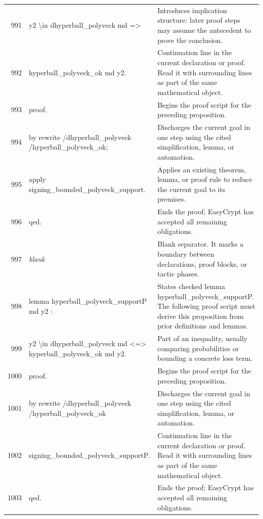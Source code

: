 \documentclass[10pt]{article}
\begin{document}
\begin{longtable}{r L{0.53\textwidth} L{0.37\textwidth}}
991 & {\ttfamily\scriptsize   y2 \textbackslash{}in dhyperball\_polyveck md =>} & Introduces implication structure: later proof steps may assume the antecedent to prove the conclusion. \\
992 & {\ttfamily\scriptsize   hyperball\_polyveck\_ok md y2.} & Continuation line in the current declaration or proof.  Read it with surrounding lines as part of the same mathematical object. \\
993 & {\ttfamily\scriptsize proof.} & Begins the proof script for the preceding proposition. \\
994 & {\ttfamily\scriptsize by rewrite /dhyperball\_polyveck /hyperball\_polyveck\_ok;} & Discharges the current goal in one step using the cited simplification, lemma, or automation. \\
995 & {\ttfamily\scriptsize    apply signing\_bounded\_polyveck\_support.} & Applies an existing theorem, lemma, or proof rule to reduce the current goal to its premises. \\
996 & {\ttfamily\scriptsize qed.} & Ends the proof; EasyCrypt has accepted all remaining obligations. \\
997 & {\ttfamily\scriptsize \emph{blank}} & Blank separator.  It marks a boundary between declarations, proof blocks, or tactic phases. \\
998 & {\ttfamily\scriptsize lemma hyperball\_polyveck\_supportP md y2 :} & States checked lemma hyperball\_polyveck\_supportP.  The following proof script must derive this proposition from prior definitions and lemmas. \\
999 & {\ttfamily\scriptsize   y2 \textbackslash{}in dhyperball\_polyveck md <=> hyperball\_polyveck\_ok md y2.} & Part of an inequality, usually comparing probabilities or bounding a concrete loss term. \\
1000 & {\ttfamily\scriptsize proof.} & Begins the proof script for the preceding proposition. \\
1001 & {\ttfamily\scriptsize by rewrite /dhyperball\_polyveck /hyperball\_polyveck\_ok} & Discharges the current goal in one step using the cited simplification, lemma, or automation. \\
1002 & {\ttfamily\scriptsize            signing\_bounded\_polyveck\_supportP.} & Continuation line in the current declaration or proof.  Read it with surrounding lines as part of the same mathematical object. \\
1003 & {\ttfamily\scriptsize qed.} & Ends the proof; EasyCrypt has accepted all remaining obligations. \\

\end{longtable}
\end{document}

